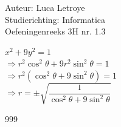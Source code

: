 \documentclass[a4paper]{article}
\begin{document}
  
\noindent \large Auteur: Luca Letroye        \\
\noindent \large Studierichting: Informatica \\
\noindent \large Oefeningenreeks 3H nr. 1.3 \\

\medskip

\normalsize

$x^2+9y^2 = 1$\\

$\Rightarrow r^2\cos^2\theta + 9 r^2\sin^2\theta = 1$\\

$\Rightarrow r^2(\cos^2\theta + 9 \sin^2\theta) = 1$\\

$\Rightarrow r = \pm \sqrt{\dfrac{1}{\cos^2 \theta + 9 \sin^2 \theta}}$\\



\begin{thebibliography}{999}
\end{thebibliography}
\end{document}
